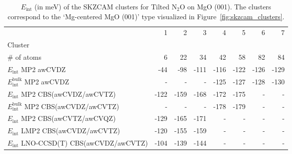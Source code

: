 \begin{table}
\caption{\label{tab:system_eint_mgo_n2o_tilted}$E_\textrm{int}$ (in meV) of the SKZCAM clusters for Tilted N$_2$O on MgO (001). The clusters correspond to the `Mg-centered MgO (001)' type visualized in Figure~\ref{fig:skzcam_clusters}.}
\begin{adjustbox}{center,max width=1.4\textwidth}
\begin{tabular}{lrrrrrrr}
\toprule
 & 1 & 2 & 3 & 4 & 5 & 6 & 7 \\ 
Cluster &  &  &  &  &  &  &  \\
\midrule
\# of atoms & 6 & 22 & 34 & 42 & 58 & 82 & 84 \\
$E_\textrm{int}$ MP2 awCVDZ & -44 & -98 & -111 & -116 & -122 & -126 & -129 \\
$E_\textrm{int}^\textrm{bulk}$ MP2 awCVDZ & - & - & - & -125 & -127 & -128 & -130 \\
$E_\textrm{int}$ MP2 CBS(awCVDZ/awCVTZ) & -122 & -159 & -168 & -172 & -175 & - & - \\
$E_\textrm{int}^\textrm{bulk}$ MP2 CBS(awCVDZ/awCVTZ) & - & - & - & -178 & -179 & - & - \\
$E_\textrm{int}$ MP2 CBS(awCVTZ/awCVQZ) & -129 & -165 & -171 & - & - & - & - \\
$E_\textrm{int}$ LMP2 CBS(awCVDZ/awCVTZ) & -120 & -155 & -159 & - & - & - & - \\
$E_\textrm{int}$ LNO-CCSD(T) CBS(awCVDZ/awCVTZ) & -104 & -139 & -144 & - & - & - & - \\
\bottomrule
\end{tabular}
\end{adjustbox}
\end{table}

